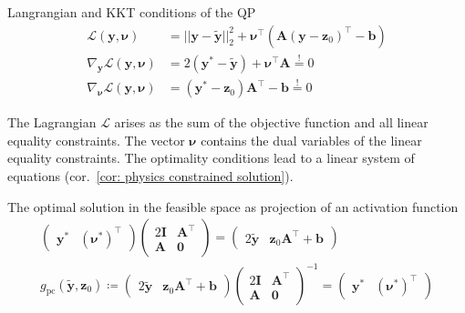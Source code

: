\begin{theorem} Langrangian and KKT conditions of the QP
    \label{th: physics constrained KKT}
    \[
        \begin{aligned}
            \mathcal{L}(\bm{y}, \bm{\nu}) &= ||\bm{y} - \bm{\tilde{y}}||_2^2 + \bm{\nu}^\top (\bm{A}(\bm{y}-\bm{z}_0)^\top - \bm{b})
            \\
            \nabla_{\bm{y}} \mathcal{L}(\bm{y}, \bm{\nu}) &= 2(\bm{y}^*-\bm{\tilde{y}}) + \bm{\nu}^\top \bm{A} \overset{!}{=} 0
            \\
            \nabla_{\bm{\nu}} \mathcal{L}(\bm{y}, \bm{\nu}) &= (\bm{y}^* - \bm{z}_0) \bm{A}^\top - \bm{b} \overset{!}{=} 0
        \end{aligned}
    \]
\end{theorem}

The Lagrangian $\mathcal{L}$ arises as the sum of the objective function and all linear equality constraints.
The vector $\bm{\nu}$ contains the dual variables of the linear equality constraints.
The optimality conditions lead to a linear system of equations (cor.~\ref{cor: physics constrained solution}).


\begin{corollary} The optimal solution in the feasible space as projection of an activation function
    \label{cor: physics constrained solution}
    \begin{gather*}
    \begin{pmatrix} \bm{y}^* & (\bm{\nu}^*)^\top \end{pmatrix}
    \begin{pmatrix}
        2 \bm{I} & \bm{A}^\top  \\
        \bm{A} & \bm{0}   
    \end{pmatrix} = 
    \begin{pmatrix} 2 \bm{\tilde{y}} & \bm{z}_0 \bm{A}^\top + \bm{b} \end{pmatrix}
    \\
    g_\text{pc}(\bm{\tilde{y}}, \bm{z}_0) \coloneq
    \begin{pmatrix} 2 \bm{\tilde{y}} & \bm{z}_0 \bm{A}^\top + \bm{b} \end{pmatrix}
        \begin{pmatrix}
        2 \bm{I} & \bm{A}^\top  \\
        \bm{A} & \bm{0}   
    \end{pmatrix} ^{-1} 
    = \begin{pmatrix} \bm{y}^* & (\bm{\nu}^*)^\top \end{pmatrix}
\end{gather*}
\end{corollary}

